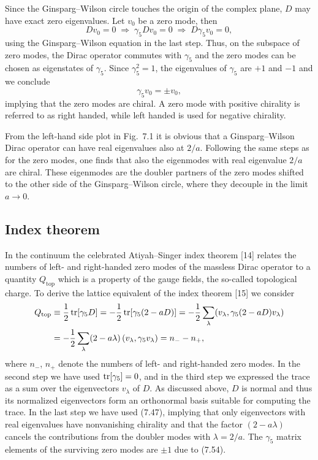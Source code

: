 Since the Ginsparg--Wilson circle touches the origin of the complex plane,
$D$ may have exact zero eigenvalues. Let $v_0$ be a zero mode, then
\begin{equation}
  D v_0 = 0 \;\Rightarrow\; \gamma_5 D v_0 = 0 \;\Rightarrow\; D\gamma_5 v_0 = 0,
\end{equation}
using the Ginsparg--Wilson equation in the last step. Thus, on the subspace of
zero modes, the Dirac operator commutes with $\gamma_5$ and the zero modes can
be chosen as eigenstates of $\gamma_5$. Since $\gamma_5^2 = 1$, the eigenvalues
of $\gamma_5$ are $+1$ and $-1$ and we conclude
\begin{equation}
  \gamma_5 v_0 = \pm v_0,
\end{equation}
implying that the zero modes are chiral. A zero mode with positive chirality
is referred to as right handed, while left handed is used for negative
chirality.

From the left-hand side plot in Fig.~7.1 it is obvious that a Ginsparg--Wilson
Dirac operator can have real eigenvalues also at $2/a$. Following the same
steps as for the zero modes, one finds that also the eigenmodes with real
eigenvalue $2/a$ are chiral. These eigenmodes are the doubler partners of the
zero modes shifted to the other side of the Ginsparg--Wilson circle, where
they decouple in the limit $a \to 0$.

\subsection{Index theorem}

In the continuum the celebrated Atiyah--Singer index theorem [14] relates the
numbers of left- and right-handed zero modes of the massless Dirac operator to
a quantity $Q_{\mathrm{top}}$ which is a property of the gauge fields, the
so-called topological charge. To derive the lattice equivalent of the index
theorem [15] we consider
\begin{align}
  Q_{\mathrm{top}} &\equiv \frac{1}{2}\operatorname{tr}[\gamma_5 D]
  = -\frac{1}{2}\operatorname{tr}[\gamma_5(2-aD)]
  = -\frac{1}{2}\sum_\lambda (v_\lambda, \gamma_5(2-aD)v_\lambda) \notag\\
  &= -\frac{1}{2}\sum_\lambda (2-a\lambda)\,(v_\lambda, \gamma_5 v_\lambda)
  = n_- - n_+,
\end{align}
where $n_-$, $n_+$ denote the numbers of left- and right-handed zero modes.
In the second step we have used $\operatorname{tr}[\gamma_5] = 0$, and in the third step we
expressed the trace as a sum over the eigenvectors $v_\lambda$ of $D$. As
discussed above, $D$ is normal and thus its normalized eigenvectors form an
orthonormal basis suitable for computing the trace. In the last step we have
used (7.47), implying that only eigenvectors with real eigenvalues have
nonvanishing chirality and that the factor $(2-a\lambda)$ cancels the
contributions from the doubler modes with $\lambda = 2/a$. The $\gamma_5$
matrix elements of the surviving zero modes are $\pm 1$ due to (7.54).


